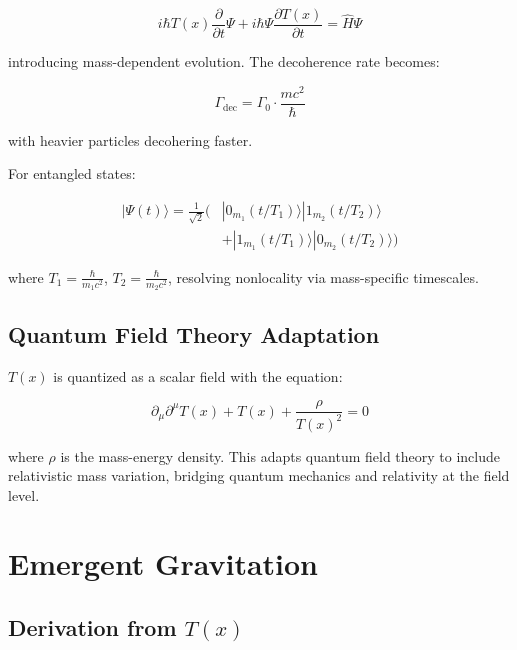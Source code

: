 \documentclass[aps,prl,twocolumn,superscriptaddress,nofootinbib]{revtex4-2}
\newcommand{\Tfield}{T(x)}
\begin{document}
	\begin{equation}
		i\hbar \Tfield \frac{\partial}{\partial t} \Psi + i\hbar \Psi \frac{\partial \Tfield}{\partial t} = \hat{H} \Psi
		\label{eq:modified_schrodinger}
	\end{equation}
	
	introducing mass-dependent evolution. The decoherence rate becomes:
	
	\begin{equation}
		\Gamma_{\text{dec}} = \Gamma_0 \cdot \frac{m c^2}{\hbar}
		\label{eq:decoherence}
	\end{equation}
	
	with heavier particles decohering faster.
	
	For entangled states:
	
	\begin{equation}
		\begin{split}
			|\Psi(t)\rangle = \frac{1}{\sqrt{2}} \Big( &|0_{m_1}(t/T_1)\rangle |1_{m_2}(t/T_2)\rangle \\
			&+ |1_{m_1}(t/T_1)\rangle |0_{m_2}(t/T_2)\rangle \Big)
		\end{split}
		\label{eq:entangled_state}
	\end{equation}
	
	where $T_1 = \frac{\hbar}{m_1 c^2}$, $T_2 = \frac{\hbar}{m_2 c^2}$, resolving nonlocality via mass-specific timescales.
	
	\subsection{Quantum Field Theory Adaptation}
	\label{subsec:qft_extension}
	
	$\Tfield$ is quantized as a scalar field with the equation:
	
	\begin{equation}
		\partial_{\mu}\partial^{\mu}\Tfield + \Tfield + \frac{\rho}{\Tfield^2} = 0
		\label{eq:field_eq}
	\end{equation}
	
	where $\rho$ is the mass-energy density. This adapts quantum field theory to include relativistic mass variation, bridging quantum mechanics and relativity at the field level.
	
	\section{Emergent Gravitation}
	\label{sec:gravitation}
	
	\subsection{Derivation from $\Tfield$}
	\label{subsec:grav_derivation}
	
\end{document}
